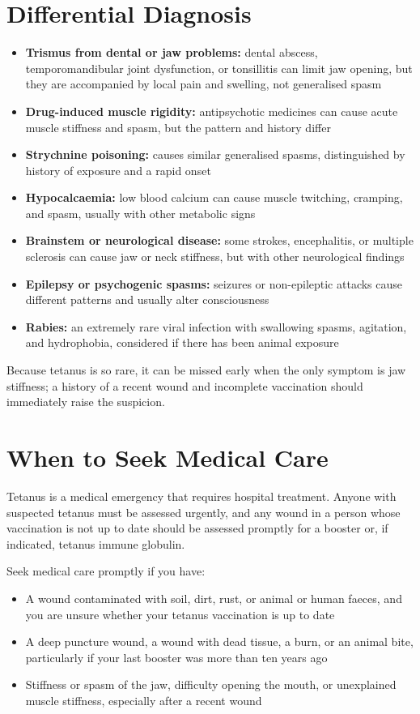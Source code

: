 \section*{Differential Diagnosis}
\begin{itemize}
    \item \textbf{Trismus from dental or jaw problems:} dental abscess, temporomandibular joint dysfunction, or tonsillitis can limit jaw opening, but they are accompanied by local pain and swelling, not generalised spasm
    \item \textbf{Drug-induced muscle rigidity:} antipsychotic medicines can cause acute muscle stiffness and spasm, but the pattern and history differ
    \item \textbf{Strychnine poisoning:} causes similar generalised spasms, distinguished by history of exposure and a rapid onset
    \item \textbf{Hypocalcaemia:} low blood calcium can cause muscle twitching, cramping, and spasm, usually with other metabolic signs
    \item \textbf{Brainstem or neurological disease:} some strokes, encephalitis, or multiple sclerosis can cause jaw or neck stiffness, but with other neurological findings
    \item \textbf{Epilepsy or psychogenic spasms:} seizures or non-epileptic attacks cause different patterns and usually alter consciousness
    \item \textbf{Rabies:} an extremely rare viral infection with swallowing spasms, agitation, and hydrophobia, considered if there has been animal exposure
\end{itemize}

Because tetanus is so rare, it can be missed early when the only symptom is jaw stiffness; a history of a recent wound and incomplete vaccination should immediately raise the suspicion.

\section*{When to Seek Medical Care}
Tetanus is a medical emergency that requires hospital treatment. Anyone with suspected tetanus must be assessed urgently, and any wound in a person whose vaccination is not up to date should be assessed promptly for a booster or, if indicated, tetanus immune globulin.

Seek medical care promptly if you have:
\begin{itemize}
    \item A wound contaminated with soil, dirt, rust, or animal or human faeces, and you are unsure whether your tetanus vaccination is up to date
    \item A deep puncture wound, a wound with dead tissue, a burn, or an animal bite, particularly if your last booster was more than ten years ago
    \item Stiffness or spasm of the jaw, difficulty opening the mouth, or unexplained muscle stiffness, especially after a recent wound
\end{itemize}


